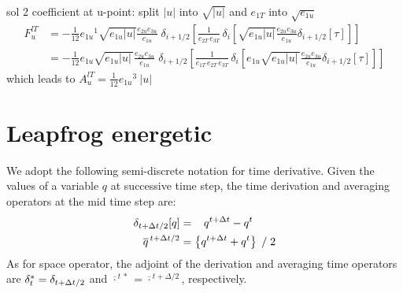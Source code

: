 \documentclass[../main/NEMO_manual]{subfiles}
\begin{document}
sol 2 coefficient at u-point: split $|u|$ into $\sqrt{|u|}$ and $e_{1T}$ into $\sqrt{e_{1u}}$
\begin{equation}
  \label{eq:tra_adv_ubs2}
  \begin{split}
    F_u^{lT} &= - \frac{1}{12} {e_{1u}}^1 \sqrt{e_{1u}|u|} \frac{e_{2u} e_{3u}}{e_{1u}}\;\delta_{i+1/2}\left[ \frac{1}{e_{2T}\,e_{3T}}\,\delta_i \left[ \sqrt{e_{1u}|u|} \frac{e_{2u} e_{3u} }{e_{1u} } \delta_{i+1/2}[\tau] \right] \right] \\
    &= - \frac{1}{12} e_{1u} \sqrt{e_{1u}|u|\,} \frac{e_{2u} e_{3u}}{e_{1u}}\;\delta_{i+1/2}\left[ \frac{1}{e_{1T}\,e_{2T}\,e_{3T}}\,\delta_i \left[ e_{1u} \sqrt{e_{1u}|u|\,} \frac{e_{2u} e_{3u} }{e_{1u}} \delta_{i+1/2}[\tau] \right] \right]
  \end{split}
\end{equation}
which leads to ${A_u^{lT}} = \frac{1}{12} {e_{1u}}^3\ |u|$

\section{Leapfrog energetic}
\label{sec:LF}

We adopt the following semi-discrete notation for time derivative.
Given the values of a variable $q$ at successive time step,
the time derivation and averaging operators at the mid time step are:
\[
  \begin{split}
    \delta_{t+\Delta t/2} [q]     &=  \  \ \,   q^{t+\Delta t}  - q^{t}		\\
    \overline q^{\,t+\Delta t/2} &= \left\{ q^{t+\Delta t} + q^{t} \right\} \; / \; 2
  \end{split}
\]
As for space operator,
the adjoint of the derivation and averaging time operators are $\delta_t^*=\delta_{t+\Delta t/2}$ and
$\overline{\cdot}^{\,t\,*}= \overline{\cdot}^{\,t+\Delta/2}$, respectively.
\end{document}
